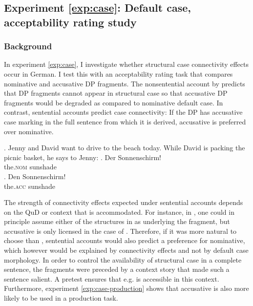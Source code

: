 \label{exp:case}
\subsection{Experiment \ref{exp:case}: Default case, acceptability rating study} \label{sec:fragments-case-rating}


\subsubsection{Background}
\label{sec:fragments-case-background}

In experiment \ref{exp:case}, I investigate whether structural case connectivity effects occur in German. I test this with an acceptability rating task that compares nominative \Next[a] and accusative \Next[b] DP fragments. The nonsentential account by \citet{barton.progovac2005} predicts that DP fragments cannot appear in structural case so that accusative DP fragments would be degraded as compared to nominative default case. In contrast, sentential accounts predict case connectivity: If the DP has accusative case marking in the full sentence from which it is derived, accusative is preferred over nominative.

\ex. Jenny and David want to drive to the beach today. While David is packing the picnic basket, he says to Jenny:\label{ex:case-sample-item}
\ag. Der Sonnenschirm!\\ 
the.\textsc{nom} sunshade\\
\bg. Den Sonnenschirm!\\
the.\textsc{acc} sunshade\\

The strength of connectivity effects expected under sentential accounts depends on the QuD or context that is accommodated. For instance, in \Last, one could in principle assume either of the structures in \Next as underlying the fragment, but accusative is only licensed in the case of \Next[a]. Therefore, if it was more natural to choose \Next[b] than \Next[a], sentential accounts would also predict a preference for nominative, which however would be explained by connectivity effects and not by default case morphology. In order to control the availability of structural case in a complete sentence, the fragments were preceded by a context story that made such a sentence salient. A pretest ensures that e.g. \Next[a] is accessible in this context. Furthermore, experiment \ref{exp:case-production} shows that accusative is also more likely to be used in a production task.\largerpage[-1]
 
